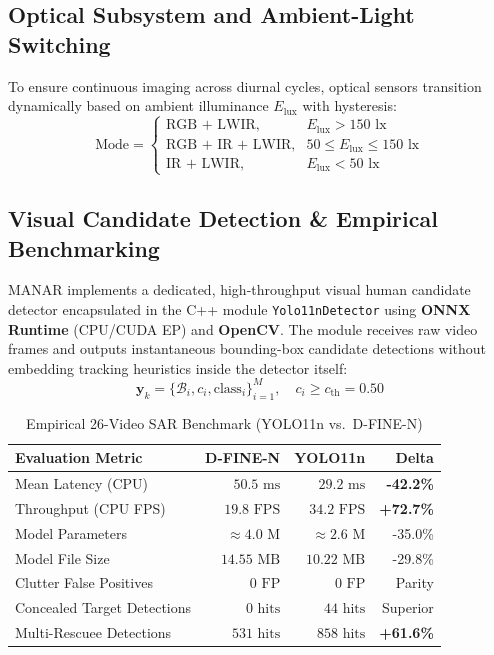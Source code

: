 \subsection{Optical Subsystem and Ambient-Light Switching}
To ensure continuous imaging across diurnal cycles, optical sensors transition dynamically based on ambient illuminance $E_{\mathrm{lux}}$ with hysteresis:
\begin{equation}
\text{Mode} = \begin{cases}
\text{RGB + LWIR}, & E_{\mathrm{lux}} > 150\text{ lx} \\
\text{RGB + IR + LWIR}, & 50 \le E_{\mathrm{lux}} \le 150\text{ lx} \\
\text{IR + LWIR}, & E_{\mathrm{lux}} < 50\text{ lx}
\end{cases}
\end{equation}

\subsection{Visual Candidate Detection \& Empirical Benchmarking}
MANAR implements a dedicated, high-throughput visual human candidate detector encapsulated in the C++ module \texttt{Yolo11nDetector} using \textbf{ONNX Runtime} (CPU/CUDA EP) and \textbf{OpenCV}. The module receives raw video frames and outputs instantaneous bounding-box candidate detections without embedding tracking heuristics inside the detector itself:
\begin{equation}
\mathbf{y}_k = \{\mathcal{B}_i, c_i, \text{class}_i\}_{i=1}^{M}, \quad c_i \ge c_{\mathrm{th}} = 0.50
\end{equation}

\begin{table}[t]
\caption{Empirical 26-Video SAR Benchmark (YOLO11n vs.\ D-FINE-N)}
\label{tab:cv_benchmark_summary}
\centering
\scriptsize
\begin{tabular*}{\columnwidth}{@{\extracolsep{\fill}}lrrr@{}}
\toprule
\textbf{Evaluation Metric} & \textbf{D-FINE-N} & \textbf{YOLO11n} & \textbf{Delta} \\
\midrule
Mean Latency (CPU) & $50.5\text{ ms}$ & $29.2\text{ ms}$ & \textbf{-42.2\%} \\
Throughput (CPU FPS) & $19.8\text{ FPS}$ & $34.2\text{ FPS}$ & \textbf{+72.7\%} \\
Model Parameters & $\approx 4.0\text{ M}$ & $\approx 2.6\text{ M}$ & -35.0\% \\
Model File Size & $14.55\text{ MB}$ & $10.22\text{ MB}$ & -29.8\% \\
Clutter False Positives & $0\text{ FP}$ & $0\text{ FP}$ & Parity \\
Concealed Target Detections & $0\text{ hits}$ & $44\text{ hits}$ & Superior \\
Multi-Rescuee Detections & $531\text{ hits}$ & $858\text{ hits}$ & \textbf{+61.6\%} \\
\bottomrule
\end{tabular*}
\end{table}

